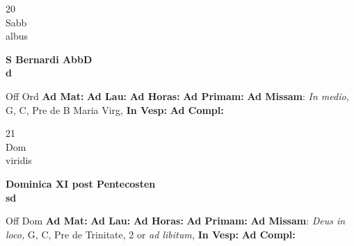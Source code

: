 \documentclass[10pt, openany]{book}
\begin{document}
    \begin{center}
        \begin{minipage}{3.5in}
            \vspace{2em}
            \begin{minipage}{0.5in}
                {\Huge 20} \\
                {\normalsize Sabb} \\
                {\normalsize albus}
            \end{minipage}
            \begin{minipage}{3.0in}
                \textbf{ \large S Bernardi AbbD \\
                \textnormal{\normalsize d}} \\ 
            \end{minipage}
            \begin{justify}Off Ord
                \textbf{Ad Mat: }
                \textbf{Ad Lau: }
                \textbf{Ad Horas: }
                \textbf{Ad Primam: }\textbf{Ad Missam}: \textit{In medio,} G, C, Pre de B Maria Virg,  
                \textbf{In Vesp: }
                \textbf{Ad Compl: }
            \end{justify}
        \end{minipage}
    \end{center}

    \begin{center}
        \begin{minipage}{3.5in}
            \vspace{2em}
            \begin{minipage}{0.5in}
                {\Huge 21} \\
                {\normalsize Dom} \\
                {\normalsize viridis}
            \end{minipage}
            \begin{minipage}{3.0in}
                \textbf{ \large Dominica XI post Pentecosten \\
                \textnormal{\normalsize sd}} \\ 
            \end{minipage}
            \begin{justify}Off Dom
                \textbf{Ad Mat: }
                \textbf{Ad Lau: }
                \textbf{Ad Horas: }
                \textbf{Ad Primam: }\textbf{Ad Missam}: \textit{Deus in loco,} G, C, Pre de Trinitate, 2 or \textit{ad libitum,}  
                \textbf{In Vesp: }
                \textbf{Ad Compl: }
            \end{justify}
        \end{minipage}
    \end{center}
\end{document}
